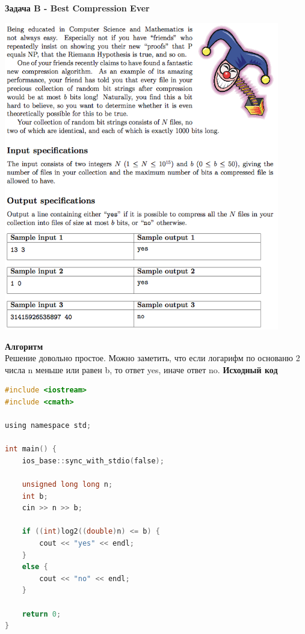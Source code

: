 \documentclass[a4paper,12pt]{article}
\begin{document}
\newpage
\textbf{{\large Задача B - Best Compression Ever}} \\
\begin{center}
\includegraphics[width=0.9\textwidth]{CT_S02E03/CT_S02E03_B.png}\\ [1cm]
\end{center}
\textbf{{\large Алгоритм}} \\
Решение довольно простое. Можно заметить, что если логарифм по основаню 2 числа n меньше или равен b, то ответ yes, иначе ответ no.
\newpage
\textbf{{\large Исходный код}} \\
\begin{lstlisting}[language=C]
#include <iostream>
#include <cmath>

using namespace std;

int main() {
    ios_base::sync_with_stdio(false);
    
    unsigned long long n;
    int b;
    cin >> n >> b;
    
    if ((int)log2((double)n) <= b) {
        cout << "yes" << endl;
    }
    else {
        cout << "no" << endl;
    }

    return 0;
}
\end{lstlisting}
\end{document}
